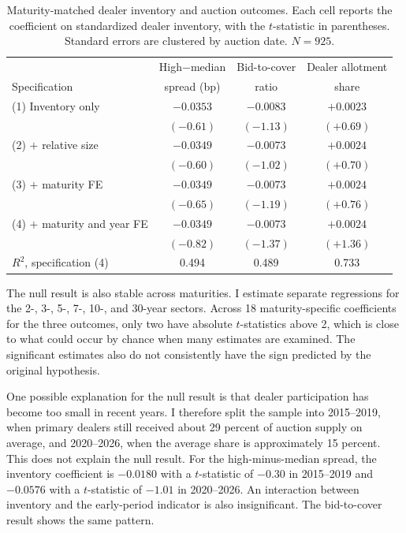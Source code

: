 \documentclass[12pt]{article}
\begin{document}
\begin{table}[htbp]
\centering
\caption{Maturity-matched dealer inventory and auction outcomes. Each cell reports the coefficient on standardized dealer inventory, with the $t$-statistic in parentheses. Standard errors are clustered by auction date. $N = 925$.}
\small
\begin{tabular}{lccc}
\toprule
 & High$-$median & Bid-to-cover & Dealer allotment \\
Specification & spread (bp) & ratio & share \\
\midrule
(1) Inventory only            & $-0.0353$ & $-0.0083$ & $+0.0023$ \\
                              & $(-0.61)$ & $(-1.13)$ & $(+0.69)$ \\
(2) $+$ relative size         & $-0.0349$ & $-0.0073$ & $+0.0024$ \\
                              & $(-0.60)$ & $(-1.02)$ & $(+0.70)$ \\
(3) $+$ maturity FE           & $-0.0349$ & $-0.0073$ & $+0.0024$ \\
                              & $(-0.65)$ & $(-1.19)$ & $(+0.76)$ \\
(4) $+$ maturity and year FE  & $-0.0349$ & $-0.0073$ & $+0.0024$ \\
                              & $(-0.82)$ & $(-1.37)$ & $(+1.36)$ \\
\midrule
$R^2$, specification (4)      & 0.494 & 0.489 & 0.733 \\
\bottomrule
\end{tabular}
\label{tab:main}
\end{table}

The null result is also stable across maturities. I estimate separate regressions for the 2-, 3-, 5-, 7-, 10-, and 30-year sectors. Across 18 maturity-specific coefficients for the three outcomes, only two have absolute $t$-statistics above 2, which is close to what could occur by chance when many estimates are examined. The significant estimates also do not consistently have the sign predicted by the original hypothesis.

One possible explanation for the null result is that dealer participation has become too small in recent years. I therefore split the sample into 2015--2019, when primary dealers still received about 29 percent of auction supply on average, and 2020--2026, when the average share is approximately 15 percent. This does not explain the null result. For the high-minus-median spread, the inventory coefficient is $-0.0180$ with a $t$-statistic of $-0.30$ in 2015--2019 and $-0.0576$ with a $t$-statistic of $-1.01$ in 2020--2026. An interaction between inventory and the early-period indicator is also insignificant. The bid-to-cover result shows the same pattern.
\end{document}
